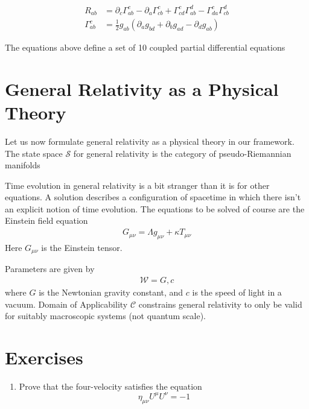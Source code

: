 \documentclass[book.tex]{subfiles}
\begin{document}
\begin{align}
    R_{ab} &= \partial_c \Gamma_{ab}^c - \partial_a \Gamma^c_{cb} + \Gamma^c_{cd}\Gamma^d_{ab} - \Gamma^c_{da}\Gamma^d_{cb} \\
    \Gamma^c_{ab} &= \frac{1}{2}g_{ab}(\partial_a g_{bd} + \partial_b g_{ad} - \partial_d g_{ab})
\end{align}


The equations above define a set of 10 coupled partial differential equations %

\section{General Relativity as a Physical Theory}

Let us now formulate general relativity as a physical theory in our framework. The state space $\mathcal{S}$ for general relativity is the category of pseudo-Riemannian manifolds %

Time evolution in general relativity is a bit stranger than it is for other equations. A solution describes a configuration of spacetime in which there isn't an explicit notion of time evolution. The equations to be solved of course are the Einstein field equation
\begin{align}
    G_{\mu \nu} = \Lambda g_{\mu \nu} + \kappa T_{\mu \nu}
\end{align}
Here $G_{\mu \nu} $ is the Einstein tensor.

Parameters are given by
\begin{align}\mathcal{W} = {G, c}\end{align} 
where $G$ is the Newtonian gravity constant, and $c$ is the speed of light in a vacuum. Domain of Applicability $\mathcal{C}$ constrains general relativity to only be valid for suitably macroscopic systems (not quantum scale).




\section{Exercises}
\begin{enumerate}
    \item Prove that the four-velocity satisfies the equation
    \begin{equation}
        \eta_{\mu\nu} U^{\mu} U^{\nu} = -1
    \end{equation}
\end{enumerate}
\end{document}
